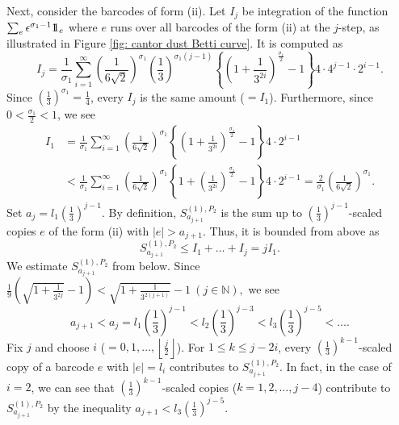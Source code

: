 \documentclass[12pt]{amsart}
\numberwithin{equation}{section}
\newcommand{\N}{\mathbb{N}}
\newcommand\jeden {1\hskip-3.5pt1}
\begin{document}
    \indent
    Next, consider the barcodes of form (ii). 
    Let $I_j$ be integration of the function $\sum_{e} \epsilon^{\sigma_1 - 1}\jeden_e$ where $e$ runs over all barcodes of the form (ii) at the $j$-step, as illustrated in Figure \ref{fig: cantor dust Betti curve}. 
    It is computed as
    \begin{equation*}
        I_j = \frac{1}{\sigma_1}\sum_{i=1}^{\infty} \left(\frac{1}{6\sqrt{2}}\right)^{\sigma_1}\left( \frac{1}{3}\right)^{\sigma_1(j-1)} \allowbreak \left\{\left(1+ \frac{1}{3^{2i}}\right)^{\frac{\sigma_1}{2}}-1\right\}4\cdot 4^{j-1} \cdot 2^{i-1}.
    \end{equation*}
    Since $\left(\frac{1}{3}\right)^{\sigma_1} = \frac{1}{4}$, every $I_j$ is the same amount ($=I_1$). 
    Furthermore, since $0< \frac{\sigma_1}{2} <1$, we see
    \begin{align*}
      I_1 &= \frac{1}{\sigma_1}\sum_{i=1}^{\infty} \left(\frac{1}{6\sqrt{2}}\right)^{\sigma_1}\left\{\left(1+\frac{1}{3^{2i}}\right)^{\frac{\sigma_1}{2}} - 1\right\}4 \cdot2^{i-1}\\
        &< \frac{1}{\sigma_1}\sum_{i=1}^{\infty} \left(\frac{1}{6\sqrt{2}}\right)^{\sigma_1} \left\{ 1 + \left(\frac{1}{3^{2i}}\right)^\frac{\sigma_1}{2} - 1\right\}4 \cdot2^{i-1}
       = \frac{2}{\sigma_1}\left(\frac{1}{6\sqrt{2}}\right)^{\sigma_1}.
    \end{align*}
    Set $a_j = l_1 \left(\frac{1}{3}\right)^{j-1}$. 
    By definition, $S_{a_{j+1}}^{(1),P_2}$ is the sum up to $\left(\frac{1}{3}\right)^{j-1}$-scaled copies $e$ of the form (ii) with $|e| > a_{j+1}$. 
    Thus, it is bounded from above as 
    \begin{equation*}
      S_{a_{j+1}}^{(1),P_2} \leq I_1 + \dots + I_j = jI_1. 
    \end{equation*}
    \indent
    We estimate $S_{a_{j+1}}^{(1),P_2}$ from below. 
    Since
    $
        \frac{1}{9}\left(\sqrt{1+\frac{1}{3^{2j}}}-1\right) < \sqrt{1+\frac{1}{3^{2(j+1)}}}-1 \ (j \in \N), 
    $ 
    we see
    \begin{equation*}
        a_{j+1} < a_j = l_1 \left(\frac{1}{3}\right)^{j-1} < l_2\left(\frac{1}{3}\right)^{j-3} < l_3 \left(\frac{1}{3}\right)^{j-5} < \dots.
    \end{equation*} 
    Fix $j$ and choose $i$ ($= 0, 1, \dots, \left\lfloor \frac{j}{2} \right\rfloor$). 
    For $1 \leq k \leq j -2i$, every $\left(\frac{1}{3}\right)^{k-1}$-scaled copy of a barcode $e$ with $|e| = l_i$ contributes to $S_{a_{j+1}}^{(1),P_2}$. 
    In fact, in the case of $i=2$, we can see that $\left(\frac{1}{3}\right)^{k-1}$-scaled copies ($k=1,2,\dots, j-4$) contribute to $S_{a_{j+1}}^{(1),P_2}$ by the inequality $a_{j+1} < l_3\left(\frac{1}{3}\right)^{j-5}$. 
\end{document}
